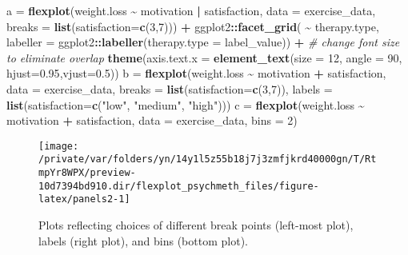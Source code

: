 \documentclass[
  english,
  man]{apa6}
\newenvironment{Shaded}{\begin{snugshade}}{\end{snugshade}}
\newcommand{\CommentTok}[1]{\textcolor[rgb]{0.56,0.35,0.01}{\textit{#1}}}
\newcommand{\DataTypeTok}[1]{\textcolor[rgb]{0.13,0.29,0.53}{#1}}
\newcommand{\DecValTok}[1]{\textcolor[rgb]{0.00,0.00,0.81}{#1}}
\newcommand{\FloatTok}[1]{\textcolor[rgb]{0.00,0.00,0.81}{#1}}
\newcommand{\KeywordTok}[1]{\textcolor[rgb]{0.13,0.29,0.53}{\textbf{#1}}}
\newcommand{\NormalTok}[1]{#1}
\newcommand{\OperatorTok}[1]{\textcolor[rgb]{0.81,0.36,0.00}{\textbf{#1}}}
\newcommand{\StringTok}[1]{\textcolor[rgb]{0.31,0.60,0.02}{#1}}
\begin{document}
\begin{Shaded}
\begin{Highlighting}[]
\NormalTok{a =}\StringTok{ }\KeywordTok{flexplot}\NormalTok{(weight.loss }\OperatorTok{\textasciitilde{}}\StringTok{ }\NormalTok{motivation }\OperatorTok{|}\StringTok{ }\NormalTok{satisfaction, }
             \DataTypeTok{data =}\NormalTok{ exercise\_data, }
             \DataTypeTok{breaks =} \KeywordTok{list}\NormalTok{(}\DataTypeTok{satisfaction=}\KeywordTok{c}\NormalTok{(}\DecValTok{3}\NormalTok{,}\DecValTok{7}\NormalTok{))) }\OperatorTok{+}
\StringTok{  }\NormalTok{ggplot2}\OperatorTok{::}\KeywordTok{facet\_grid}\NormalTok{( }\OperatorTok{\textasciitilde{}}\StringTok{ }\NormalTok{therapy.type, }
              \DataTypeTok{labeller =}\NormalTok{ ggplot2}\OperatorTok{::}\KeywordTok{labeller}\NormalTok{(}\DataTypeTok{therapy.type =}\NormalTok{ label\_value)) }\OperatorTok{+}
\StringTok{  }\CommentTok{\# change font size to eliminate overlap}
\StringTok{    }\KeywordTok{theme}\NormalTok{(}\DataTypeTok{axis.text.x =} 
            \KeywordTok{element\_text}\NormalTok{(}\DataTypeTok{size =} \DecValTok{12}\NormalTok{, }\DataTypeTok{angle =} \DecValTok{90}\NormalTok{, }\DataTypeTok{hjust=}\FloatTok{0.95}\NormalTok{,}\DataTypeTok{vjust=}\FloatTok{0.5}\NormalTok{))}
\NormalTok{b =}\StringTok{ }\KeywordTok{flexplot}\NormalTok{(weight.loss }\OperatorTok{\textasciitilde{}}\StringTok{ }\NormalTok{motivation }\OperatorTok{+}\StringTok{ }\NormalTok{satisfaction, }
             \DataTypeTok{data =}\NormalTok{ exercise\_data, }
             \DataTypeTok{breaks =} \KeywordTok{list}\NormalTok{(}\DataTypeTok{satisfaction=}\KeywordTok{c}\NormalTok{(}\DecValTok{3}\NormalTok{,}\DecValTok{7}\NormalTok{)), }
             \DataTypeTok{labels =} \KeywordTok{list}\NormalTok{(}\DataTypeTok{satisfaction=}\KeywordTok{c}\NormalTok{(}\StringTok{"low"}\NormalTok{, }\StringTok{"medium"}\NormalTok{, }\StringTok{"high"}\NormalTok{)))}
\NormalTok{c =}\StringTok{ }\KeywordTok{flexplot}\NormalTok{(weight.loss }\OperatorTok{\textasciitilde{}}\StringTok{ }\NormalTok{motivation }\OperatorTok{+}\StringTok{ }\NormalTok{satisfaction, }
             \DataTypeTok{data =}\NormalTok{ exercise\_data, }
             \DataTypeTok{bins =} \DecValTok{2}\NormalTok{) }
\end{Highlighting}
\end{Shaded}

\normalsize

\small

\begin{figure}

{\centering \texttt{[image: /private/var/folders/yn/14y1l5z55b18j7j3zmfjkrd40000gn/T/RtmpYr8WPX/preview-10d7394bd910.dir/flexplot\_psychmeth\_files/figure-latex/panels2-1]} 

}

\caption{Plots reflecting choices of different break points (left-most plot), labels (right plot), and bins (bottom plot). \label{fig:panels2}}\label{fig:panels2}
\end{figure}
\end{document}
